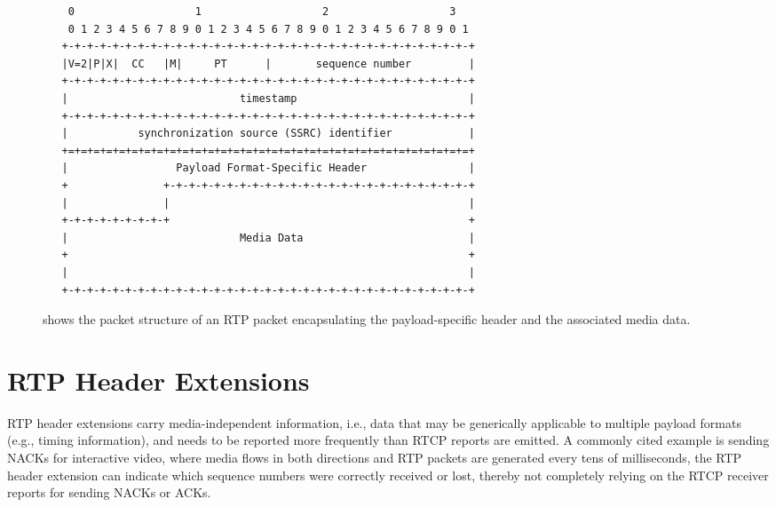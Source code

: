 \begin{figure}[!h]
\begin{spacing}{0.5}
{\footnotesize
\begin{verbatim}
    0                   1                   2                   3
    0 1 2 3 4 5 6 7 8 9 0 1 2 3 4 5 6 7 8 9 0 1 2 3 4 5 6 7 8 9 0 1
   +-+-+-+-+-+-+-+-+-+-+-+-+-+-+-+-+-+-+-+-+-+-+-+-+-+-+-+-+-+-+-+-+
   |V=2|P|X|  CC   |M|     PT      |       sequence number         |
   +-+-+-+-+-+-+-+-+-+-+-+-+-+-+-+-+-+-+-+-+-+-+-+-+-+-+-+-+-+-+-+-+
   |                           timestamp                           |
   +-+-+-+-+-+-+-+-+-+-+-+-+-+-+-+-+-+-+-+-+-+-+-+-+-+-+-+-+-+-+-+-+
   |           synchronization source (SSRC) identifier            |
   +=+=+=+=+=+=+=+=+=+=+=+=+=+=+=+=+=+=+=+=+=+=+=+=+=+=+=+=+=+=+=+=+
   |                 Payload Format-Specific Header                |
   +               +-+-+-+-+-+-+-+-+-+-+-+-+-+-+-+-+-+-+-+-+-+-+-+-+
   |               |                                               |
   +-+-+-+-+-+-+-+-+                                               +
   |                           Media Data                          |
   +                                                               +
   |                                                               |
   +-+-+-+-+-+-+-+-+-+-+-+-+-+-+-+-+-+-+-+-+-+-+-+-+-+-+-+-+-+-+-+-+
\end{verbatim}
}
\end{spacing}
\caption{shows the packet structure of an RTP packet encapsulating the
payload-specific header and the associated media data.}
\label{fig:3:pt.fmt}
\end{figure}


\section{RTP Header Extensions}

RTP header extensions carry media-independent information, i.e., data that may
be generically applicable to multiple payload formats (e.g., timing
information), and needs to be reported more frequently than RTCP reports are
emitted. A commonly cited example is sending NACKs for interactive video,
where media flows in both directions and RTP packets are generated every tens
of milliseconds, the RTP header extension can indicate which sequence numbers
were correctly received or lost, thereby not completely relying on the RTCP
receiver reports for sending NACKs or ACKs.

